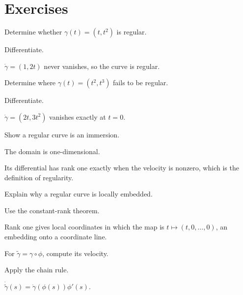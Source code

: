 \section{Exercises}

\begin{exercise}\label{exr:vii12-01}
Determine whether $\gamma(t)=(t,t^2)$ is regular.
\end{exercise}
\begin{hint}
Differentiate.
\end{hint}
\begin{solution}
$\dot\gamma=(1,2t)$ never vanishes, so the curve is regular.
\end{solution}

\begin{exercise}\label{exr:vii12-02}
Determine where $\gamma(t)=(t^2,t^3)$ fails to be regular.
\end{exercise}
\begin{hint}
Differentiate.
\end{hint}
\begin{solution}
$\dot\gamma=(2t,3t^2)$ vanishes exactly at $t=0$.
\end{solution}

\begin{exercise}\label{exr:vii12-03}
Show a regular curve is an immersion.
\end{exercise}
\begin{hint}
The domain is one-dimensional.
\end{hint}
\begin{solution}
Its differential has rank one exactly when the velocity is nonzero, which is the definition of regularity.
\end{solution}

\begin{exercise}\label{exr:vii12-04}
Explain why a regular curve is locally embedded.
\end{exercise}
\begin{hint}
Use the constant-rank theorem.
\end{hint}
\begin{solution}
Rank one gives local coordinates in which the map is $t\mapsto(t,0,\ldots,0)$, an embedding onto a coordinate line.
\end{solution}

\begin{exercise}\label{exr:vii12-05}
For $\widetilde\gamma=\gamma\circ\phi$, compute its velocity.
\end{exercise}
\begin{hint}
Apply the chain rule.
\end{hint}
\begin{solution}
$\dot{\widetilde\gamma}(s)=\dot\gamma(\phi(s))\phi'(s)$.
\end{solution}

